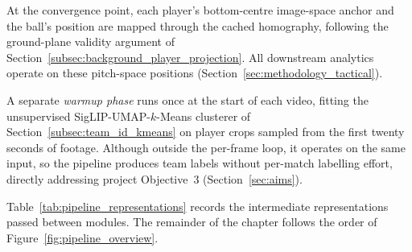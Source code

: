 At the convergence point, each player's bottom-centre image-space anchor and
the ball's position are mapped through the cached homography, following the
ground-plane validity argument of
Section~\ref{subsec:background_player_projection}. All downstream analytics
operate on these pitch-space positions (Section~\ref{sec:methodology_tactical}).

A separate \emph{warmup phase} runs once at the start of each video, fitting
the unsupervised SigLIP-UMAP-$k$-Means clusterer of Section~\ref{subsec:team_id_kmeans} on
player crops sampled from the first twenty seconds of footage. Although
outside the per-frame loop, it operates on the same input, so the pipeline
produces team labels without per-match labelling effort, directly
addressing project Objective~3 (Section~\ref{sec:aims}).

Table~\ref{tab:pipeline_representations} records the intermediate
representations passed between modules. The remainder of the chapter follows
the order of Figure~\ref{fig:pipeline_overview}.

